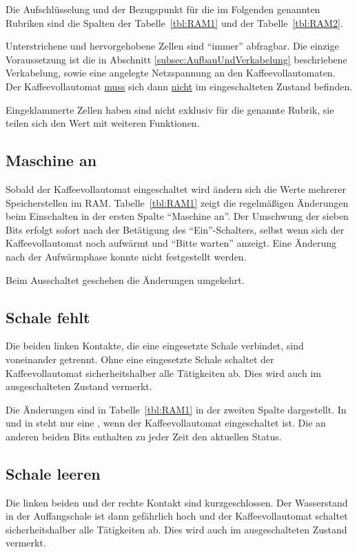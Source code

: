 Die Aufschlüsselung und der Bezugspunkt für die im Folgenden genannten Rubriken sind die Spalten der Tabelle~\ref{tbl:RAM1} und der Tabelle~\ref{tbl:RAM2}.

Unterstrichene und hervorgehobene Zellen sind "`immer"' abfragbar.
Die einzige Voraussetzung ist die in Abschnitt \ref{subsec:AufbauUndVerkabelung} beschriebene Verkabelung, sowie eine angelegte Netzspannung an den Kaffeevollautomaten.
Der Kaffeevollautomat \underline{muss} sich dann \underline{nicht} im eingeschalteten Zustand befinden.

Eingeklammerte Zellen haben sind nicht exklusiv für die genannte Rubrik, sie teilen sich den Wert mit weiteren Funktionen.

\subsection{Maschine an}
Sobald der Kaffeevollautomat eingeschaltet wird ändern sich die Werte mehrerer Speicherstellen im \ac{RAM}.
Tabelle~\ref{tbl:RAM1} zeigt die regelmäßigen Änderungen beim Einschalten in der ersten Spalte "`Maschine an"'.
Der Umschwung der sieben Bits erfolgt sofort nach der Betätigung des "`Ein"'-Schalters, selbst wenn sich der Kaffeevollautomat noch aufwärmt und "`Bitte warten"' anzeigt.
Eine Änderung nach der Aufwärmphase konnte nicht festgestellt werden.

Beim Ausschaltet geschehen die Änderungen umgekehrt.

\subsection{Schale fehlt}
Die beiden linken Kontakte, die eine eingesetzte Schale verbindet, sind voneinander getrennt.
Ohne eine eingesetzte Schale schaltet der Kaffeevollautomat sicherheitshalber alle Tätigkeiten ab.
Dies wird auch im ausgeschalteten Zustand vermerkt.

Die Änderungen sind in Tabelle~\ref{tbl:RAM1} in der zweiten Spalte dargestellt.
In  und in  steht nur eine , wenn der Kaffeevollautomat eingeschaltet ist.
Die an anderen beiden Bits enthalten zu jeder Zeit den aktuellen Status.

\subsection{Schale leeren}
Die linken beiden und der rechte Kontakt sind kurzgeschlossen.
Der Wasserstand in der Auffangschale ist dann gefährlich hoch und der Kaffeevollautomat schaltet sicherheitshalber alle Tätigkeiten ab.
Dies wird auch im ausgeschalteten Zustand vermerkt.


